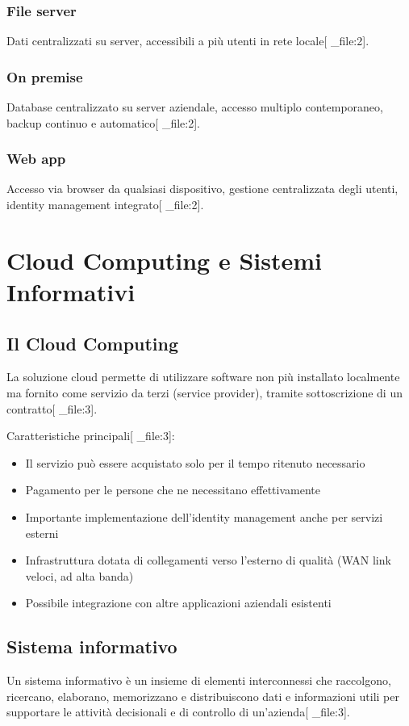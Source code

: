 \documentclass[12pt,a4paper]{article}
\begin{document}
\subsubsection{File server}
Dati centralizzati su server, accessibili a più utenti in rete locale[ _file:2].

\subsubsection{On premise}
Database centralizzato su server aziendale, accesso multiplo contemporaneo, backup continuo e automatico[ _file:2].

\subsubsection{Web app}
Accesso via browser da qualsiasi dispositivo, gestione centralizzata degli utenti, identity management integrato[ _file:2].

\section{Cloud Computing e Sistemi Informativi}

\subsection{Il Cloud Computing}
La soluzione cloud permette di utilizzare software non più installato localmente ma fornito come servizio da terzi (service provider), tramite sottoscrizione di un contratto[ _file:3].

Caratteristiche principali[ _file:3]:
\begin{itemize}
    \item Il servizio può essere acquistato solo per il tempo ritenuto necessario
    \item Pagamento per le persone che ne necessitano effettivamente
    \item Importante implementazione dell'identity management anche per servizi esterni
    \item Infrastruttura dotata di collegamenti verso l'esterno di qualità (WAN link veloci, ad alta banda)
    \item Possibile integrazione con altre applicazioni aziendali esistenti
\end{itemize}

\subsection{Sistema informativo}
Un sistema informativo è un insieme di elementi interconnessi che raccolgono, ricercano, elaborano, memorizzano e distribuiscono dati e informazioni utili per supportare le attività decisionali e di controllo di un'azienda[ _file:3].
\end{document}
